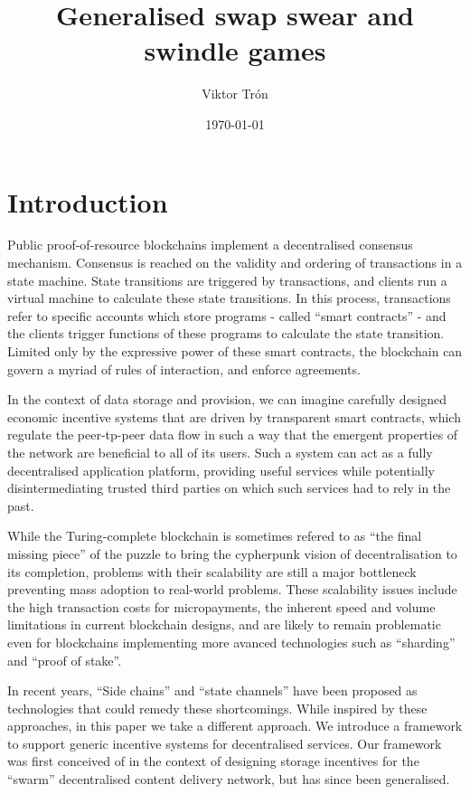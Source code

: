 \documentclass[a4paper,10pt]{article}
\title{Generalised swap swear and swindle games}
\author{Viktor Trón}
\date{\today}
\begin{document}
\maketitle
\begin{abstract}
\end{abstract}

\tableofcontents

\section{Introduction}
Public proof-of-resource blockchains implement a decentralised consensus mechanism. Consensus is reached on the validity and ordering of
transactions in a state machine. State transitions are triggered by transactions, and clients run a virtual machine to calculate these state transitions. In this process, transactions refer to specific accounts which store programs - called ``smart contracts'' - and the clients trigger functions of these programs to calculate the state transition. Limited only by the expressive power of these smart contracts, the blockchain can govern a myriad of rules of interaction, and enforce agreements.

In the context of data storage and provision, we can imagine carefully designed economic incentive systems that are driven by transparent smart contracts, which regulate the peer-tp-peer data flow in such a way that the emergent properties of the network are beneficial to all of its users.
Such a system can act as a fully decentralised application platform, providing useful services while potentially
disintermediating trusted third parties on which such services had to rely in the past.

While the Turing-complete blockchain is sometimes refered to as ``the final missing piece'' of the puzzle to bring the cypherpunk vision
of decentralisation to its completion, problems with their scalability are still a major bottleneck preventing mass adoption to real-world problems. These scalability issues include the high transaction costs for micropayments, the inherent speed and volume limitations in current blockchain designs, and are likely to remain problematic even for blockchains implementing more avanced technologies such as ``sharding'' and ``proof of stake''.

In recent years, ``Side chains'' and ``state channels'' have been proposed as technologies that could remedy these shortcomings.
While inspired by these approaches, in this paper we take a different approach. %
We introduce a framework to support generic incentive systems for decentralised services. Our framework was first conceived of in the context of designing storage incentives for the ``swarm'' decentralised content delivery network, but has since been generalised.
\end{document}
